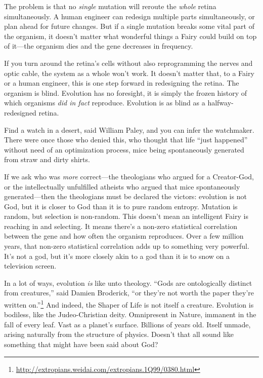  The problem is that no \textit{single} mutation will reroute the
\textit{whole} retina simultaneously. A human engineer can redesign
multiple parts simultaneously, or plan ahead for future changes. But if
a single mutation breaks some vital part of the organism, it
doesn't matter what wonderful things a Fairy could
build on top of it---the organism dies and the gene decreases in
frequency.


 If you turn around the retina's cells without also
reprogramming the nerves and optic cable, the system as a whole
won't work. It doesn't matter that, to
a Fairy or a human engineer, this is one step forward in redesigning
the retina. The organism is blind. Evolution has no foresight, it is
simply the frozen history of which organisms \textit{did in fact}
reproduce. Evolution is as blind as a halfway-redesigned retina.


 Find a watch in a desert, said William Paley, and you can infer
the watchmaker. There were once those who denied this, who thought that
life ``just happened'' without need
of an optimization process, mice being spontaneously generated from
straw and dirty shirts.


 If we ask who was \textit{more} correct---the theologians who
argued for a Creator-God, or the intellectually unfulfilled atheists
who argued that mice spontaneously generated---then the theologians
must be declared the victors: evolution is not God, but it is closer to
God than it is to pure random entropy. Mutation is random, but
selection is non-random. This doesn't mean an
intelligent Fairy is reaching in and selecting. It means
there's a non-zero statistical correlation between the
gene and how often the organism reproduces. Over a few million years,
that non-zero statistical correlation adds up to something very
powerful. It's not a god, but it's more
closely akin to a god than it is to snow on a television screen.


 In a lot of ways, evolution \textit{is} like unto theology.
``Gods are ontologically distinct from
creatures,'' said Damien Broderick,
``or they're not worth the paper
they're written on.''\footnote{\url{http://extropians.weidai.com/extropians.1Q99/0380.html}} And indeed, the
Shaper of Life is not itself a creature. Evolution is bodiless, like
the Judeo-Christian deity. Omnipresent in Nature, immanent in the fall
of every leaf. Vast as a planet's surface. Billions of
years old. Itself unmade, arising naturally from the structure of
physics. Doesn't that all sound like something that
might have been said about God?


